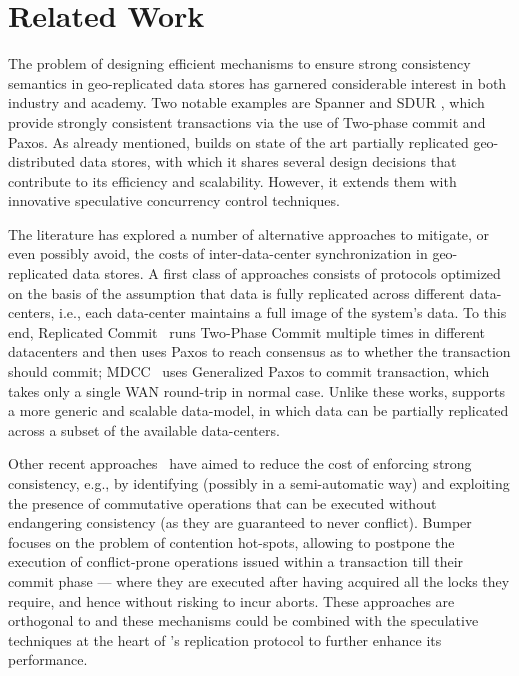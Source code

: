 \section{Related Work}
The problem of designing efficient mechanisms to ensure strong consistency semantics in geo-replicated data stores has garnered considerable interest in both industry and academy. Two notable examples are Spanner \cite{spanner} and SDUR \cite{scatter}, which  provide strongly consistent transactions via the use of Two-phase commit and Paxos. As already mentioned, \specula builds on state of the art partially replicated geo-distributed data stores, with which it shares several design decisions that contribute to its efficiency and scalability. However, it extends them with innovative speculative concurrency control techniques.

The literature has explored a number of alternative approaches to mitigate, or even possibly avoid, the costs of inter-data-center synchronization in geo-replicated data stores. A first class of approaches consists of protocols  optimized on the basis of the assumption that data is fully replicated across different data-centers, i.e., each data-center maintains a full image of the system's data. To this end, Replicated Commit~\cite{mahmoud2013low} runs Two-Phase Commit multiple times
in different datacenters and then uses Paxos to reach consensus as to whether the transaction should commit; MDCC~\cite{kraska2013mdcc} uses Generalized Paxos \cite{lamport2005generalized} to commit transaction, which takes only a single WAN round-trip in normal case. Unlike these works, \specula supports a more generic and scalable data-model, in which data can be partially replicated across a subset of the available data-centers.

 
 Other recent approaches~\cite{zhang2013transaction,swiftcloud,sovran2011transactional} have aimed to reduce the cost of enforcing strong consistency, e.g., by identifying (possibly in a semi-automatic way) and exploiting the presence of commutative operations that can be executed without endangering consistency (as they are guaranteed  to never conflict). Bumper~\cite{diegues2013bumper}  focuses on the problem of contention hot-spots, allowing to postpone the execution of conflict-prone operations issued within a transaction till their commit phase --- where they are executed after having acquired all the locks they require, and hence without risking to incur aborts. These approaches are orthogonal to \specula and  these mechanisms  could be combined with the speculative techniques  at the heart of \specula's replication protocol to further enhance its performance.
 

